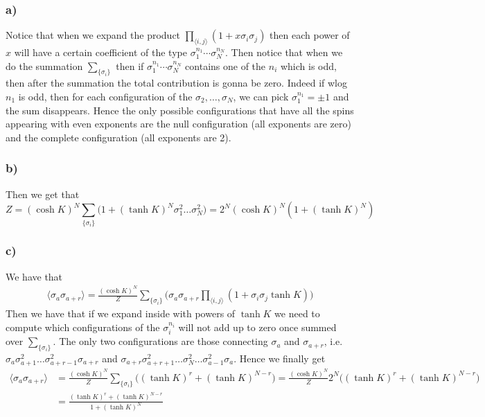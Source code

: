 \documentclass[10pt,a4paper]{book}
\begin{document}
\subsubsection*{a)}
Notice that when we expand the product $\prod_{\langle i,j\rangle}(1+x\sigma_i\sigma_j)$ then each power of $x$ will have a certain coefficient of the type $\sigma_1^{n_1}\cdots \sigma_N^{n_N}$. Then notice that when we do the summation $\sum_{\{\sigma_i\}}$ then if $\sigma_1^{n_1}\cdots \sigma_N^{n_N}$ contains one of the $n_i$ which is odd, then after the summation the total contribution is gonna be zero. Indeed if wlog $n_1$ is odd, then for each configuration of the $\sigma_2,\ldots,\sigma_N$, we can pick $\sigma_1^{n_1}=\pm 1$ and the sum disappears. Hence the only possible configurations that have all the spins appearing with even exponents are the null configuration (all exponents are zero) and the complete configuration (all exponents are 2). 

\subsubsection*{b)}
Then we get that 
$$Z=(\cosh K)^N \sum_{\{\sigma_i\}} \bigg(1+(\tanh K)^N\sigma_1^{2}\ldots\sigma_N^2\bigg)=2^{N}(\cosh K)^N(1+(\tanh K)^N)$$

\subsubsection*{c)}
We have that
\begin{align*}
\langle \sigma_a\sigma_{a+r}\rangle =\frac{(\cosh K)^N}{Z}\sum_{\{\sigma_i\}}\bigg(\sigma_a\sigma_{a+r}\prod_{\langle i,j\rangle}(1+\sigma_i\sigma_j\tanh K)\bigg)
\end{align*}
Then we have that if we expand inside with powers of $\tanh K$ we need to compute which configurations of the $\sigma_i^{n_i}$ will not add up to zero once summed over $\sum_{\{\sigma_i\}}$. The only two configurations are those connecting $\sigma_a$ and $\sigma_{a+r}$, i.e. $\sigma_a\sigma_{a+1}^2\ldots\sigma_{a+r-1}^2\sigma_{a+r}$ and $\sigma_{a+r}\sigma_{a+r+1}^2\ldots\sigma_N^2\ldots\sigma_{a-1}^2\sigma_a$. Hence we finally get 
\begin{align*}
\langle \sigma_a\sigma_{a+r}\rangle&=\frac{(\cosh K)^N}{Z}\sum_{\{\sigma_i\}}\bigg((\tanh K)^{r}+(\tanh K)^{N-r}\bigg)=\frac{(\cosh K)^N}{Z}2^N\bigg((\tanh K)^{r}+(\tanh K)^{N-r}\bigg)\\
&=\frac{(\tanh K)^r+(\tanh K)^{N-r}}{1+(\tanh K)^N}
\end{align*}
\end{document}
